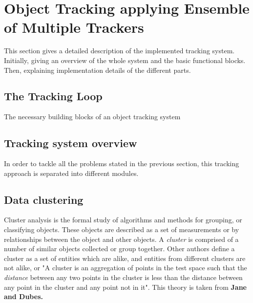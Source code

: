 
\chapter{Object Tracking applying Ensemble of Multiple Trackers} %

\label{Chapter3} %


This section gives a detailed description of the implemented tracking system. Initially, giving an overview of the whole system and the basic functional blocks. Then, explaining implementation details of the different parts.

\section{The Tracking Loop}

The necessary building blocks of an object tracking system

\section{Tracking system overview}

In order to tackle all the problems stated in the previous section, this tracking approach is separated into different modules.

\section{Data clustering}

Cluster analysis is the formal study of algorithms and methods for grouping, or classifying objects. These objects are described as a set of measurements or by relationships between the object and other objects. A \textit{cluster} is comprised of a number of similar objects collected or group together. Other authors define a cluster as a set of entities which are alike, and entities from different clusters are not alike, or "A cluster is an aggregation of points in the test space such that the \textit{distance} between any two points in the cluster is less than the distance between any point in the cluster and any point not in it". This theory is taken from \textbf{Jane and Dubes.}

